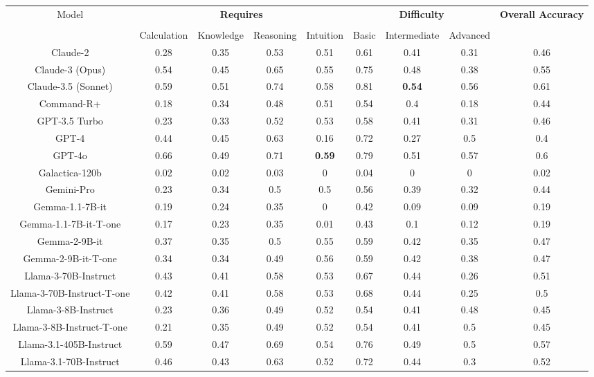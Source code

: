 \begin{tabular}{ccccccccc}
\toprule
\multirow{3}{*}{Model} & \multicolumn{4}{c}{\textbf{Requires}} & \multicolumn{3}{c}{\textbf{Difficulty}} & \multirow{3}{*}{\textbf{Overall Accuracy}}\\\cmidrule(lr){2-5} \cmidrule(lr){6-8}\\
 & Calculation & Knowledge & Reasoning & Intuition & Basic & Intermediate & Advanced &  \\
\midrule
Claude-2 & 0.28 & 0.35 & 0.53 & 0.51 & 0.61 & 0.41 & 0.31 & 0.46 \\
Claude-3 (Opus) & 0.54 & 0.45 & 0.65 & 0.55 & 0.75 & 0.48 & 0.38 & 0.55 \\
Claude-3.5 (Sonnet) & 0.59 & 0.51 & 0.74 & 0.58 & 0.81 & \textbf{0.54} & 0.56 & 0.61 \\
Command-R+ & 0.18 & 0.34 & 0.48 & 0.51 & 0.54 & 0.4 & 0.18 & 0.44 \\
GPT-3.5 Turbo & 0.23 & 0.33 & 0.52 & 0.53 & 0.58 & 0.41 & 0.31 & 0.46 \\
GPT-4 & 0.44 & 0.45 & 0.63 & 0.16 & 0.72 & 0.27 & 0.5 & 0.4 \\
GPT-4o & 0.66 & 0.49 & 0.71 & \textbf{0.59} & 0.79 & 0.51 & 0.57 & 0.6 \\
Galactica-120b & 0.02 & 0.02 & 0.03 & 0 & 0.04 & 0 & 0 & 0.02 \\
Gemini-Pro & 0.23 & 0.34 & 0.5 & 0.5 & 0.56 & 0.39 & 0.32 & 0.44 \\
Gemma-1.1-7B-it & 0.19 & 0.24 & 0.35 & 0 & 0.42 & 0.09 & 0.09 & 0.19 \\
Gemma-1.1-7B-it-T-one & 0.17 & 0.23 & 0.35 & 0.01 & 0.43 & 0.1 & 0.12 & 0.19 \\
Gemma-2-9B-it & 0.37 & 0.35 & 0.5 & 0.55 & 0.59 & 0.42 & 0.35 & 0.47 \\
Gemma-2-9B-it-T-one & 0.34 & 0.34 & 0.49 & 0.56 & 0.59 & 0.42 & 0.38 & 0.47 \\
Llama-3-70B-Instruct & 0.43 & 0.41 & 0.58 & 0.53 & 0.67 & 0.44 & 0.26 & 0.51 \\
Llama-3-70B-Instruct-T-one & 0.42 & 0.41 & 0.58 & 0.53 & 0.68 & 0.44 & 0.25 & 0.5 \\
Llama-3-8B-Instruct & 0.23 & 0.36 & 0.49 & 0.52 & 0.54 & 0.41 & 0.48 & 0.45 \\
Llama-3-8B-Instruct-T-one & 0.21 & 0.35 & 0.49 & 0.52 & 0.54 & 0.41 & 0.5 & 0.45 \\
Llama-3.1-405B-Instruct & 0.59 & 0.47 & 0.69 & 0.54 & 0.76 & 0.49 & 0.5 & 0.57 \\
Llama-3.1-70B-Instruct & 0.46 & 0.43 & 0.63 & 0.52 & 0.72 & 0.44 & 0.3 & 0.52 \\

\end{tabular}
